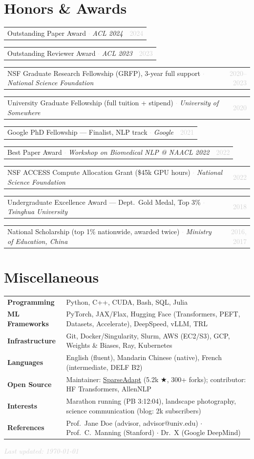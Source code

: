 \documentclass[10pt, letterpaper]{article}
\makeatletter
\newcommand{\honorrow}[3]{%
  \begin{tabularx}{\linewidth}{@{}X r@{}}
    #1 \textcolor{lightgray}{$\cdot$} \textit{\small #2} & {\small\textcolor{lightgray}{#3}}
  \end{tabularx}\vspace{1pt}%
}
\makeatother
\begin{document}
\section{Honors \& Awards}

\honorrow{Outstanding Paper Award}{ACL 2024}{2024}
\honorrow{Outstanding Reviewer Award}{ACL 2023}{2023}
\honorrow{NSF Graduate Research Fellowship (GRFP), 3-year full support}{National Science Foundation}{2020--2023}
\honorrow{University Graduate Fellowship (full tuition + stipend)}{University of Somewhere}{2020}
\honorrow{Google PhD Fellowship --- Finalist, NLP track}{Google}{2021}
\honorrow{Best Paper Award}{Workshop on Biomedical NLP @ NAACL 2022}{2022}
\honorrow{NSF ACCESS Compute Allocation Grant (\$45k GPU hours)}{National Science Foundation}{2022}
\honorrow{Undergraduate Excellence Award --- Dept.\ Gold Medal, Top 3\%}{Tsinghua University}{2018}
\honorrow{National Scholarship (top 1\% nationwide, awarded twice)}{Ministry of Education, China}{2016, 2017}

\section{Miscellaneous}

\begin{tabularx}{\linewidth}{@{}>{\bfseries\small}p{2.5cm}X@{}}
  Programming   & Python, C++, CUDA, Bash, SQL, Julia \\[1.5pt]
  ML Frameworks & PyTorch, JAX/Flax, Hugging Face (Transformers, PEFT, Datasets, Accelerate), DeepSpeed, vLLM, TRL \\[1.5pt]
  Infrastructure & Git, Docker/Singularity, Slurm, AWS (EC2/S3), GCP, Weights \& Biases, Ray, Kubernetes \\[1.5pt]
  Languages     & English (fluent), Mandarin Chinese (native), French (intermediate, DELF B2) \\[1.5pt]
  Open Source   & Maintainer: \href{https://github.com/}{SparseAdapt} (5.2k $\bigstar$, 300+ forks); contributor: HF Transformers, AllenNLP \\[1.5pt]
  Interests     & Marathon running (PB 3:12:04), landscape photography, science communication (blog: 2k subscribers) \\[1.5pt]
  References    & Prof.\ Jane Doe (advisor, advisor@univ.edu) $\cdot$ Prof.\ C.\ Manning (Stanford) $\cdot$ Dr.\ X (Google DeepMind) \\
\end{tabularx}

\vspace{8pt}
\noindent\textcolor{lightgray}{\footnotesize\textit{Last updated: \today}}
\end{document}
